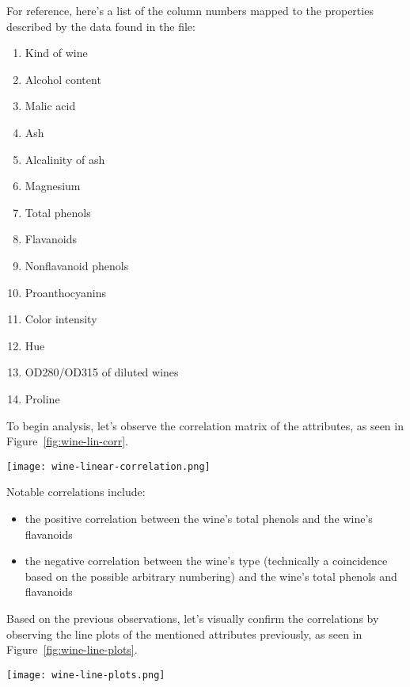 \documentclass[
  coursecode={CMPE 251},
  assignmentname={Exercise 1},
  studentnumber=20053722,
  name={Bryan Hoang}
]{
  ltxanswer%
}
\begin{document}
\begin{questions}
    \begin{solution}
      For reference, here's a list of the column numbers mapped to the properties described by the data found in the  file:
      \begin{enumerate}[twocol, leftmargin=2.5em]
        \item Kind of wine
        \item Alcohol content
        \item Malic acid
        \item Ash
        \item Alcalinity of ash
        \item Magnesium
        \item Total phenols
        \item Flavanoids
        \item Nonflavanoid phenols
        \item Proanthocyanins
        \item Color intensity
        \item Hue
        \item OD280/OD315 of diluted wines
        \item Proline
      \end{enumerate}

      \newpage

      To begin analysis, let's observe the correlation matrix of the attributes, as seen in Figure~\ref{fig:wine-lin-corr}.
      \begin{answerfigure}
        \captionsetup{type=figure}
        \texttt{[image: wine-linear-correlation.png]}
        \label{fig:wine-lin-corr}
      \end{answerfigure}

      Notable correlations include:
      \begin{itemize}
        \item the positive correlation between the wine's total phenols and the wine's flavanoids
        \item the negative correlation between the wine's type (technically a coincidence based on the possible arbitrary numbering) and the wine's total phenols and flavanoids
      \end{itemize}

      \newpage

      Based on the previous observations, let's visually confirm the correlations by observing the line plots of the mentioned attributes previously, as seen in Figure~\ref{fig:wine-line-plots}.
      \begin{answerfigure}
        \captionsetup{type=figure}
        \texttt{[image: wine-line-plots.png]}
        \label{fig:wine-line-plots}
      \end{answerfigure}


\end{solution}
\end{questions}
\end{document}
